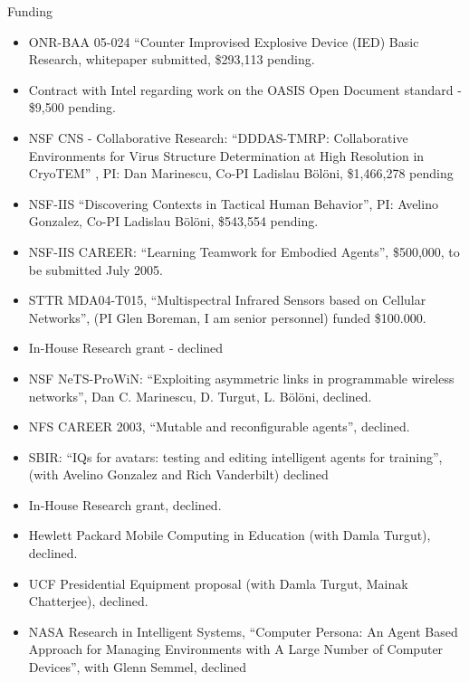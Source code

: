 \begin{category}{Funding}

\begin{itemize}
\item ONR-BAA 05-024 ``Counter Improvised Explosive Device (IED) Basic Research,
whitepaper submitted, \$293,113 pending.
\item Contract with Intel regarding work on the OASIS Open Document standard -
\$9,500 pending. 
\item NSF CNS - Collaborative Research: ``DDDAS-TMRP: Collaborative Environments
for Virus Structure Determination at High Resolution in CryoTEM'' , PI: Dan
Marinescu, Co-PI Ladislau B{\"o}l{\"o}ni, \$1,466,278 pending 
\item NSF-IIS ``Discovering Contexts in Tactical Human Behavior'',  PI: Avelino
Gonzalez, Co-PI Ladislau B{\"o}l{\"o}ni, \$543,554 pending.
\item NSF-IIS CAREER: ``Learning Teamwork for Embodied Agents'', \$500,000, to
be submitted July 2005.
\end{itemize}

\begin{itemize}
\item STTR MDA04-T015, ``Multispectral Infrared Sensors based on Cellular
Networks'', (PI Glen Boreman, I am senior personnel) funded \$100.000.
\item In-House Research grant - declined
\item NSF NeTS-ProWiN: ``Exploiting asymmetric links in programmable wireless
networks'', Dan C. Marinescu, D. Turgut, L. B{\"o}l{\"o}ni, declined. 
\end{itemize}


\begin{itemize}
\item NFS CAREER 2003, ``Mutable and reconfigurable agents'', declined.
\item SBIR:  ``IQs for avatars: testing and editing intelligent agents for
training'', (with Avelino Gonzalez and Rich Vanderbilt) declined
\item In-House Research grant, declined. 
\item Hewlett Packard Mobile Computing in Education (with Damla Turgut),
declined. 
\item UCF Presidential Equipment proposal (with Damla Turgut, Mainak
Chatterjee), declined. 
\item NASA Research in Intelligent Systems, ``Computer Persona: An Agent Based
Approach for Managing Environments with A Large Number of Computer Devices'',
with Glenn Semmel, declined
\end{itemize}


\end{category}
